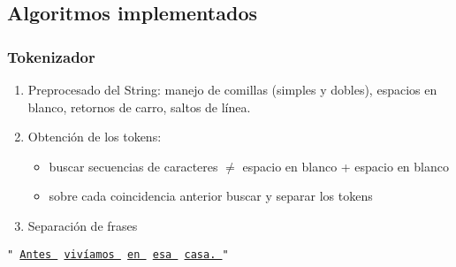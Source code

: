 \documentclass{beamer}
\begin{document}
\subsection{Algoritmos implementados}
\begin{frame}
\frametitle{Tokenizador}
\begin{enumerate}
\item Preprocesado del String: manejo de comillas (simples y dobles), espacios en blanco, retornos de carro, saltos de línea.
\item Obtención de los tokens: 
\begin{itemize}
\item buscar secuencias de caracteres $\neq$ espacio en blanco + espacio en blanco
\item sobre cada coincidencia anterior buscar y separar los tokens
\end{itemize}
\item Separación de frases
\end{enumerate}
\begin{example}
\begin{scriptsize}
\texttt{"\ \underline{Antes } \underline{vivíamos } \underline{en } \underline{esa } \underline{casa. }"}
\end{scriptsize}
\end{example}
\end{frame}
\end{document}
